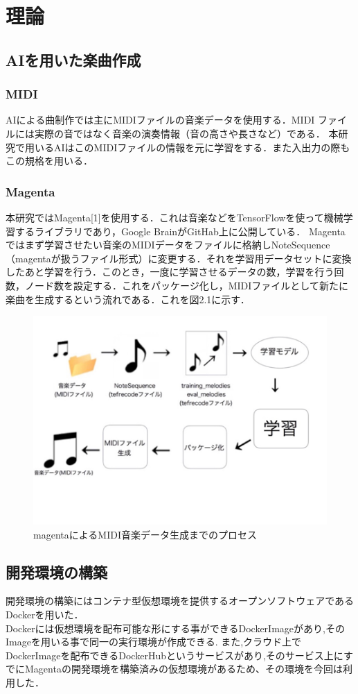 \chapter{理論}
\section{AIを用いた楽曲作成}
\subsection{MIDI}
AIによる曲制作では主にMIDIファイルの音楽データを使用する．MIDI ファイルには実際の音ではなく音楽の演奏情報（音の高さや長さなど）である．
本研究で用いるAIはこのMIDIファイルの情報を元に学習をする．また入出力の際もこの規格を用いる．
\subsection{Magenta}
本研究ではMagenta[1]を使用する．これは音楽などをTensorFlowを使って機械学習するライブラリであり，Google BrainがGitHab上に公開している．
Magentaではまず学習させたい音楽のMIDIデータをファイルに格納しNoteSequence（magentaが扱うファイル形式）に変更する．それを学習用データセットに変換したあと学習を行う．このとき，一度に学習させるデータの数，学習を行う回数，ノード数を設定する．これをパッケージ化し，MIDIファイルとして新たに楽曲を生成するという流れである．これを図2.1に示す．\\
\newpage
\begin{figure}[!ht]
    \begin{screen}
    \begin{center}
        \includegraphics[scale=1.5, clip]{./img/MIDI_make.png}
        \caption{magentaによるMIDI音楽データ生成までのプロセス}
        \label{fig:magentaによるMIDI音楽データ生成でのプロセス}
    \end{center}
    \end{screen}
\end{figure}
\section{開発環境の構築}
開発環境の構築にはコンテナ型仮想環境を提供するオープンソフトウェアであるDockerを用いた．\\
 Dockerには仮想環境を配布可能な形にする事ができるDockerImageがあり,そのImageを用いる事で同一の実行環境が作成できる.
また,クラウド上でDockerImageを配布できるDockerHubというサービスがあり,そのサービス上にすでにMagentaの開発環境を構築済みの仮想環境があるため、その環境を今回は利用した．